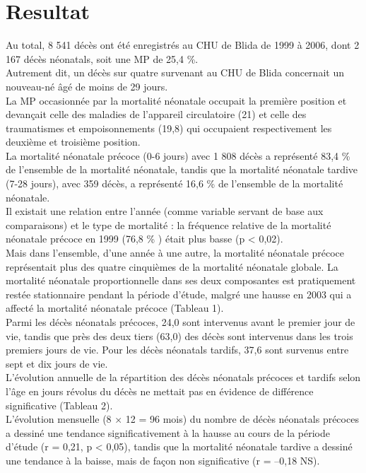 \section{Resultat}
Au total, 8 541 décès ont été enregistrés au CHU de Blida
de 1999 à 2006, dont 2 167 décès néonatals, soit une MP de
25,4 \%.\\
Autrement dit, un décès sur quatre survenant au
CHU de Blida concernait un nouveau-né âgé de moins
de 29 jours. \\ 
La MP occasionnée par la mortalité néonatale
occupait la première position et devançait celle des maladies
de l’appareil circulatoire (21) et celle des traumatismes et
empoisonnements (19,8) qui occupaient respectivement
les deuxième et troisième position. \\

La mortalité néonatale précoce (0-6 jours) avec 1 808
décès a représenté 83,4 \% de l’ensemble de la mortalité
néonatale, tandis que la mortalité néonatale tardive
(7-28 jours), avec 359 décès, a représenté 16,6 \%  de
l’ensemble de la mortalité néonatale.\\ 

Il existait une relation
entre l’année (comme variable servant de base aux
comparaisons) et le type de mortalité : la fréquence relative
de la mortalité néonatale précoce en 1999 (76,8 \% ) était plus
basse (p < 0,02). \\ 

Mais dans l’ensemble, d’une année à une
autre, la mortalité néonatale précoce représentait plus des
quatre cinquièmes de la mortalité néonatale globale.
La mortalité néonatale proportionnelle dans ses deux
composantes est pratiquement restée stationnaire pendant la
période d’étude, malgré une hausse en 2003 qui a affecté la
mortalité néonatale précoce (Tableau 1).\\

Parmi les décès néonatals précoces, 24,0  sont intervenus
avant le premier jour de vie, tandis que près des deux
tiers (63,0) des décès sont intervenus dans les trois
premiers jours de vie. Pour les décès néonatals tardifs,
37,6 sont survenus entre sept et dix jours de vie.\\

L’évolution annuelle de la répartition des décès néonatals
précoces et tardifs selon l’âge en jours révolus du décès
ne mettait pas en évidence de différence significative
(Tableau 2).\\

L’évolution mensuelle (8 × 12 = 96 mois) du nombre de
décès néonatals précoces a dessiné une tendance significativement
à la hausse au cours de la période d’étude (r = 0,21,
p < 0,05), tandis que la mortalité néonatale tardive a dessiné
une tendance à la baisse, mais de façon non significative
(r = –0,18 NS). \\ 

